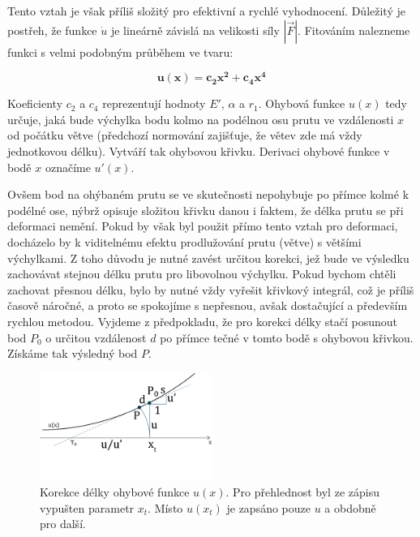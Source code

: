 \pagebreak
Tento vztah je však příliš složitý pro efektivní a rychlé vyhodnocení. Důležitý je postřeh, že funkce $\dot{u}$ je lineárně závislá na velikosti síly $|\vec{F}|$. Fitováním nalezneme funkci s velmi podobným průběhem ve tvaru:

\begin{equation}
\label{eq:bendFunction}\mathbf{
u(x) = c_2 x^2 + c_4 x^4}
\end{equation}

Koeficienty $c_2$ a $c_4$ reprezentují hodnoty ${E}'$, $\alpha$ a $r_1$. Ohybová funkce $u(x)$ tedy určuje, jaká bude výchylka bodu kolmo na podélnou osu prutu ve vzdálenosti $x$ od počátku větve (předchozí normování zajišťuje, že větev zde má vždy jednotkovou délku). Vytváří tak ohybovou křivku. Derivaci ohybové funkce v bodě $x$ označíme ${u}'(x)$.

Ovšem bod na ohýbaném prutu se ve skutečnosti nepohybuje po přímce kolmé k podélné ose, nýbrž opisuje složitou křivku danou i faktem, že délka prutu se při deformaci nemění. Pokud by však byl použit přímo tento vztah pro deformaci, docházelo by k viditelnému efektu prodlužování prutu (větve) s většími výchylkami. Z toho důvodu je nutné zavést určitou korekci, jež bude ve výsledku zachovávat stejnou délku prutu pro libovolnou výchylku. Pokud bychom chtěli zachovat přesnou délku, bylo by nutné vždy vyřešit křivkový integrál, což je příliš časově náročné, a proto se spokojíme s nepřesnou, avšak dostačující a především rychlou metodou.
Vyjdeme z předpokladu, že pro korekci délky stačí posunout bod $P_0$ o určitou vzdálenost $d$ po přímce tečné v tomto bodě s ohybovou křivkou. Získáme tak výsledný bod $P$. 

\begin{figure}[!hbt]
\begin{center}
\includegraphics[width=0.5\textwidth]{./figures/lengthCorrection3.png}
\end{center}
\caption[Korekce délky ohybové funkce]%
{Korekce délky ohybové funkce $u(x)$. Pro přehlednost byl ze zápisu vypušten parametr $x_t$. Místo $u(x_t)$ je zapsáno pouze $u$ a obdobně pro další.
\label{fig:bendCorrection}
}
\end{figure}

